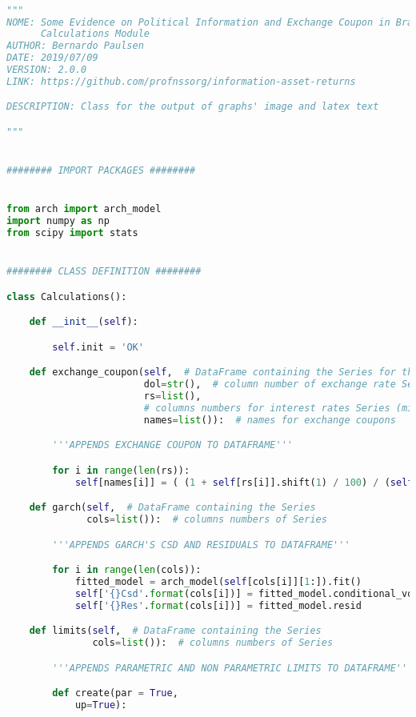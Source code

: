 \begin{lstlisting}[language=Python]

"""
NOME: Some Evidence on Political Information and Exchange Coupon in Brazil -
      Calculations Module
AUTHOR: Bernardo Paulsen
DATE: 2019/07/09
VERSION: 2.0.0
LINK: https://github.com/profnssorg/information-asset-returns

DESCRIPTION: Class for the output of graphs' image and latex text

"""


######## IMPORT PACKAGES ########


from arch import arch_model
import numpy as np
from scipy import stats


######## CLASS DEFINITION ########

class Calculations():

    def __init__(self):

        self.init = 'OK'

    def exchange_coupon(self,  # DataFrame containing the Series for the exchange coupon
                        dol=str(),  # column number of exchange rate Series
                        rs=list(),
                        # columns numbers for interest rates Series (min 1 number, if > 1 then more than one measure of exchange coupon is generated)
                        names=list()):  # names for exchange coupons

        '''APPENDS EXCHANGE COUPON TO DATAFRAME'''

        for i in range(len(rs)):
            self[names[i]] = ( (1 + self[rs[i]].shift(1) / 100) / (self[dol] / self[dol].shift(1)) - 1)

    def garch(self,  # DataFrame containing the Series
              cols=list()):  # columns numbers of Series

        '''APPENDS GARCH'S CSD AND RESIDUALS TO DATAFRAME'''

        for i in range(len(cols)):
            fitted_model = arch_model(self[cols[i]][1:]).fit()
            self['{}Csd'.format(cols[i])] = fitted_model.conditional_volatility
            self['{}Res'.format(cols[i])] = fitted_model.resid

    def limits(self,  # DataFrame containing the Series
               cols=list()):  # columns numbers of Series

        '''APPENDS PARAMETRIC AND NON PARAMETRIC LIMITS TO DATAFRAME'''

        def create(par = True,
            up=True):


\end{lstlisting}
